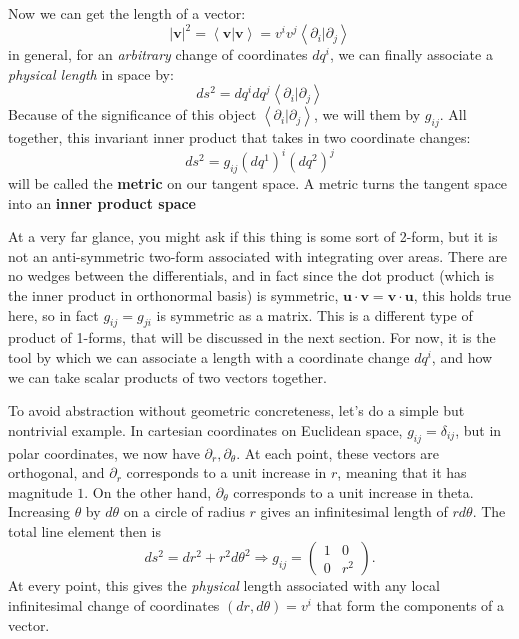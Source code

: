 \documentclass[../master.tex]{subfiles}
\begin{document}
	Now we can get the length of a vector:
	\begin{equation}
		|\mathbf v|^2 = \left< \mathbf v | \mathbf v \right> = v^i v^j \left< \partial_i | \partial_j \right> 
	\end{equation}
	in general, for an \emph{arbitrary} change of coordinates $dq^i$, we can finally associate a \emph{physical length} in space by:
	\begin{equation}
		ds^2 = dq^i dq^j  \left< \partial_i | \partial_j \right> 
	\end{equation}
	Because of the significance of this object $\left< \partial_i | \partial_j \right>$, we will them by $g_{ij}$. All together, this invariant inner product that takes in two coordinate changes:
	\begin{equation}
		ds^2 = g_{ij} {(dq^1)}^i {(dq^2)}^j 
	\end{equation}
	will be called the \textbf{metric} on our tangent space. A metric turns the tangent space into an \textbf{inner product space}
	
	At a very far glance, you might ask if this thing is some sort of 2-form, but it is not an anti-symmetric two-form associated with integrating over areas. There are no wedges between the differentials, and in fact since the dot product (which is the inner product in orthonormal basis) is symmetric, $\mathbf u \cdot \mathbf v = \mathbf v \cdot \mathbf u$, this holds true here, so in fact $g_{ij} = g_{ji}$ is symmetric as a matrix. This is a different type of product of 1-forms, that will be discussed in the next section. For now, it is the tool by which we can associate a length with a coordinate change $dq^i$, and how we can take scalar products of two vectors together. 
	
	To avoid abstraction without geometric concreteness, let's do a simple but nontrivial example. In cartesian coordinates on Euclidean space, $g_{ij} = \delta_{ij}$, but in polar coordinates, we now have $\partial_r, \partial_\theta$. At each point, these vectors are orthogonal, and $\partial_r$ corresponds to a unit increase in $r$, meaning that it has magnitude $1$. On the other hand, $\partial_\theta$ corresponds to a unit increase in theta. Increasing $\theta$ by $d\theta$ on a circle of radius $r$ gives an infinitesimal length of $r d\theta$. The total line element then is
	\begin{equation}
		ds^2 = dr^2 + r^2 d\theta^2 \Rightarrow g_{ij} = 
		\begin{pmatrix}
			1 & 0 \\
			0 & r^2 
		\end{pmatrix}.
	\end{equation}
	At every point, this gives the \emph{physical} length associated with any local infinitesimal change of coordinates $(dr, d\theta) = v^i$ that form the components of a vector.
	
\end{document}

